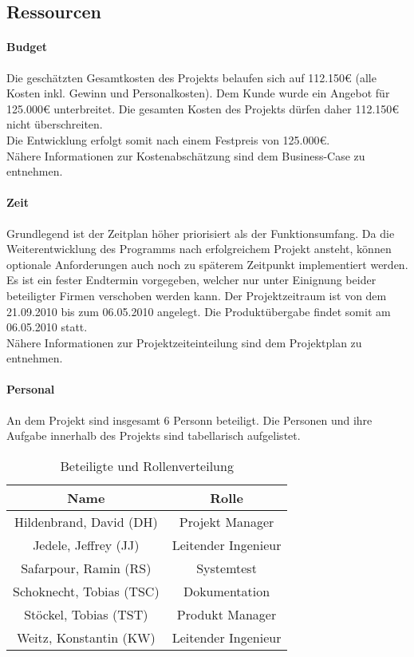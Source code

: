 \subsection{Ressourcen}

\paragraph{Budget}

Die geschätzten Gesamtkosten des Projekts belaufen sich auf 112.150€ (alle
Kosten inkl. Gewinn und Personalkosten). Dem Kunde wurde ein Angebot für
125.000€ unterbreitet. Die gesamten Kosten des Projekts dürfen daher 112.150€
nicht überschreiten.\\ Die Entwicklung erfolgt somit nach einem Festpreis von 125.000€. \\ Nähere Informationen zur Kostenabschätzung sind dem Business-Case zu entnehmen.

\paragraph{Zeit}
Grundlegend ist der Zeitplan höher priorisiert als der Funktionsumfang. 
Da die Weiterentwicklung des Programms nach erfolgreichem Projekt ansteht, können optionale Anforderungen auch noch zu späterem Zeitpunkt implementiert werden.\\
Es ist ein fester Endtermin vorgegeben, welcher nur unter Einignung beider beteiligter Firmen verschoben werden kann.
Der Projektzeitraum ist von dem 21.09.2010 bis zum 06.05.2010 angelegt. Die Produktübergabe findet somit am 06.05.2010 statt.
\\
Nähere Informationen zur Projektzeiteinteilung sind dem Projektplan zu entnehmen.

\paragraph{Personal}

An dem Projekt sind insgesamt 6 Personn beteiligt. Die Personen und ihre Aufgabe innerhalb des Projekts sind tabellarisch aufgelistet.

\begin{table}[htdp]
\caption{Beteiligte und Rollenverteilung}
\label{tab:beteiligte}
\begin{center}
\begin{tabular}{|c|c|}
\hline
\textbf{Name} & \textbf{Rolle}\\
\hline
Hildenbrand, David (DH) & Projekt Manager\\
\hline
Jedele, Jeffrey (JJ) & Leitender Ingenieur\\
\hline
Safarpour, Ramin (RS) & Systemtest\\
\hline
Schoknecht, Tobias (TSC) & Dokumentation\\
\hline
Stöckel, Tobias (TST) & Produkt Manager\\
\hline
Weitz, Konstantin (KW) & Leitender Ingenieur\\
\hline
\end{tabular}
\end{center}
\label{default}
\end{table}

